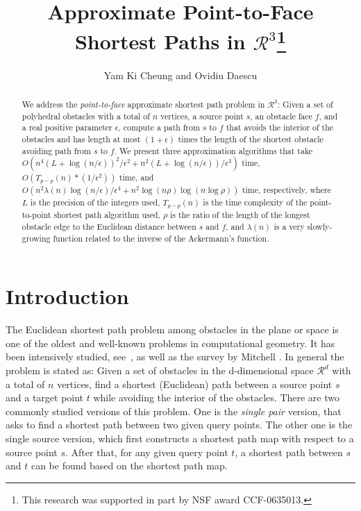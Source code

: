 \documentclass{llncs}
\title{Approximate Point-to-Face Shortest Paths in $\mathcal{R}^3$\thanks{This
research was supported in part by NSF award CCF-0635013.}}
\author{Yam Ki Cheung and Ovidiu Daescu}
\institute{Department of Computer Science \\
       University of Texas at Dallas \\
       Richardson, TX 75080, USA \\
       {\tt \{ykcheung,daescu\}@utdallas.edu}}
\begin{document}
\pagestyle{empty}
\maketitle

\begin{abstract}
We address the {\em point-to-face} approximate shortest path problem in $\mathcal{R}^3$:
Given a set of polyhedral obstacles with a total of $n$ vertices, a source point $s$,
an obstacle face $f$, and a real positive parameter $\epsilon$, compute a path from $s$ to $f$
that avoids the interior of the obstacles and has length at most $(1+\epsilon)$ times the length
of the shortest obstacle avoiding path from $s$ to $f$.
We present three approximation algorithms that take
$O(n^4(L+\log(n/\epsilon))^2/\epsilon^2+n^2(L+\log(n/\epsilon))/\epsilon^3)$ time,
$O(T_{p-p}(n)*(1/\epsilon^2))$ time, and
$O(n^2\lambda(n)\log(n/\epsilon)/{\epsilon}^4+n^2\log(n\rho)\log(n\log\rho))$ time,
respectively, where $L$ is the precision of the integers used, $T_{p-p}(n)$ is the time
complexity of the point-to-point shortest path algorithm used, $\rho$ is the ratio of the length
of the longest obstacle edge to the
Euclidean distance between $s$ and $f$, and $\lambda(n)$ is a very slowly-growing function related to
the inverse of the Ackermann's function.
\end{abstract}

\section{Introduction}

The Euclidean shortest path problem among obstacles in the plane or space is one of the oldest and
 well-known problems in computational geometry. It has been intensively studied,
see~\cite{agarwal,chen,Clar87,har-peled,Her99,KMM97, Sar99,Pap85,sharir,Sharir86,GM87,KM88,OW88,Mit96,Mount84, Mit87},
as well as the survey by Mitchell \cite{Mit00}.
In general the problem is stated as: Given a set of obstacles in the d-dimensional
space $\mathcal{R}^d$ with a total of $n$ vertices, find a shortest (Euclidean) path between a source
point $s$ and a target point $t$ while avoiding the interior of the obstacles. There are two
commonly studied versions of this problem. One is the {\em single pair} version, that asks to find a
shortest path between two given query points. The other one is the
single source version, which first constructs a shortest path map with respect to a source
point $s$. After that, for any given query point $t$, a shortest path between $s$ and $t$ can be
found based on the shortest path map.
\end{document}
